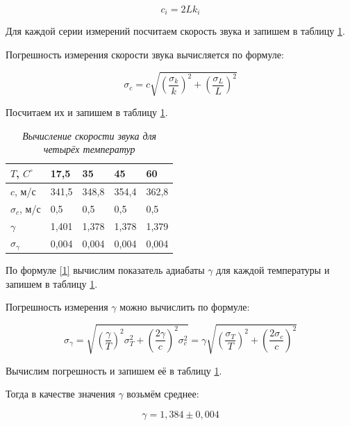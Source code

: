 \documentclass[a4paper,12pt]{article}
\begin{document}
\begin{equation}\label{eq:c}
    c_i = 2 L k_i
\end{equation}

Для каждой серии измерений посчитаем скорость звука и запишем в таблицу \ref{table:res-1}.

Погрешность измерения скорости звука вычисляется по формуле:

\begin{equation}\label{eq:sigma-c}
    \sigma_c = c \sqrt{\left( \frac{\sigma_k}{k} \right)^2 + \left( \frac{\sigma_L}{L} \right)^2}
\end{equation}

Посчитаем их и запишем в таблицу \ref{table:res-1}.

\begin{table}[!ht]
    \centering
    \begin{tabular}{|l|l|l|l|l|}
    \hline
        $T$, $C^\circ$ & 17,5 & 35 & 45 & 60 \\ \hline
        $c$, м/с & 341,5 & 348,8 & 354,4 & 362,8 \\ \hline
        $\sigma_c$, м/с & 0,5 & 0,5 & 0,5 & 0,5 \\ \hline
        $\gamma$ & 1,401 & 1,378 & 1,378 & 1,379 \\ \hline
        $\sigma_\gamma$ & 0,004 & 0,004 & 0,004 & 0,004 \\ \hline
    \end{tabular}\caption{\textit{Вычисление скорости звука для четырёх температур}}\label{table:res-1}
\end{table}

По формуле \eqref{1} вычислим показатель адиабаты $\gamma$ для каждой температуры и запишем в таблицу \ref{table:res-1}. 

Погрешность измерения $\gamma$ можно вычислить по формуле:

\begin{equation}\label{eq:sigma-gamma}
    \sigma_\gamma = \sqrt{
    \left( \frac{\gamma}{T} \right)^2 \sigma_T^2 + 
    \left( \frac{2\gamma}{c} \right)^2 \sigma_c^2
    } = \gamma \sqrt{\left( \frac{\sigma_T}{T} \right)^2 + \left( \frac{2 \sigma_c}{c} \right)^2}
\end{equation}

Вычислим погрешность и запишем её в таблицу \ref{table:res-1}.

Тогда в качестве значения $\gamma$ возьмём среднее:

\begin{equation*}
    \gamma = 1,384 \pm 0,004
\end{equation*}
\end{document}
